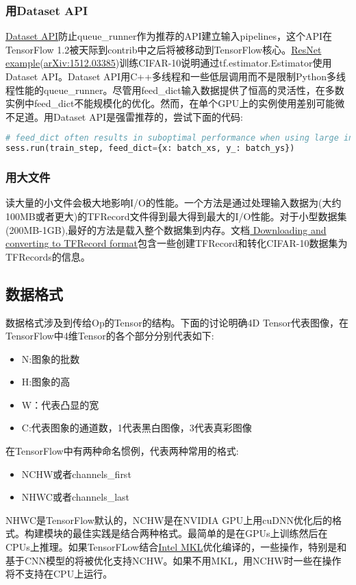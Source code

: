  \subsubsection{用Dataset API}
 \href{https://www.tensorflow.org/programmers_guide/datasets}{Dataset API}防止queue\_runner作为推荐的API建立输入pipelines，这个API在TensorFlow 1.2被天际到contrib中之后将被移动到TensorFlow核心。\href{https://github.com/tensorflow/models/blob/master/tutorials/image/cifar10_estimator/cifar10_main.py}{ResNet example}(\href{https://arxiv.org/pdf/1512.03385.pdf}{arXiv:1512.03385})训练CIFAR-10说明通过tf.estimator.Estimator使用Dataset API。Dataset API用C++多线程和一些低层调用而不是限制Python多线程性能的queue\_runner。尽管用feed\_dict输入数据提供了恒高的灵活性，在多数实例中feed\_dict不能规模化的优化。然而，在单个GPU上的实例使用差别可能微不足道。用Dataset API是强雷推荐的，尝试下面的代码:
 \begin{lstlisting}[language=Python]
 # feed_dict often results in suboptimal performance when using large inputs.
sess.run(train_step, feed_dict={x: batch_xs, y_: batch_ys})
 \end{lstlisting}
 \subsubsection{用大文件}
 读大量的小文件会极大地影响I/O的性能。一个方法是通过处理输入数据为(大约100MB或者更大)的TFRecord文件得到最大得到最大的I/O性能。对于小型数据集(200MB-1GB),最好的方法是载入整个数据集到内存。文档\href{https://github.com/tensorflow/models/tree/master/slim#Data}{ Downloading and converting to TFRecord format}包含一些创建TFRecord和转化CIFAR-10数据集为TFRecords的信息。
 \subsection{数据格式}
 数据格式涉及到传给Op的Tensor的结构。下面的讨论明确4D Tensor代表图像，在TensorFlow中4维Tensor的各个部分分别代表如下:
 \begin{itemize}
 	\item N:图象的批数
 	\item H:图象的高
 	\item W：代表凸显的宽
 	\item C:代表图象的通道数，1代表黑白图像，3代表真彩图像
 \end{itemize}
 在TensorFlow中有两种命名惯例，代表两种常用的格式:
 \begin{itemize}
 	\item NCHW或者channels\_first
 	\item NHWC或者channels\_last
 \end{itemize}
 NHWC是TensorFlow默认的，NCHW是在NVIDIA GPU上用cuDNN优化后的格式。构建模块的最佳实践是结合两种格式。最简单的是在GPUs上训练然后在CPUs上推理。如果TensorFLow结合\href{https://www.tensorflow.org/performance/performance_guide#tensorflow_with_intel_mkl_dnn}{Intel MKL}优化编译的，一些操作，特别是和基于CNN模型的将被优化支持NCHW。如果不用MKL，用NCHW时一些在操作将不支持在CPU上运行。
